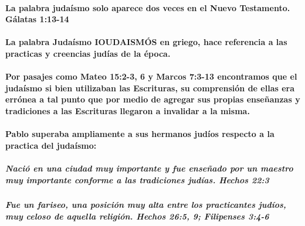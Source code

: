 \documentclass[11a pt,twoside]{article}
\let\oldparagraph\paragraph
\renewcommand{\paragraph}{\needspace{3\baselineskip}\oldparagraph}
\let\oldsubparagraph\subparagraph
\renewcommand{\subparagraph}{\needspace{2\baselineskip}\oldsubparagraph}
\begin{document}
\paragraph{La palabra judaísmo solo aparece dos veces en el Nuevo
Testamento. Gálatas
1:13-14}\label{la-palabra-judauxedsmo-solo-aparece-dos-veces-en-el-nuevo-testamento.-guxe1latas-113-14}

\paragraph{La palabra Judaísmo IOUDAISMÓS en griego, hace referencia a
las practicas y creencias judías de la
época.}\label{la-palabra-judauxedsmo-ioudaismuxf3s-en-griego-hace-referencia-a-las-practicas-y-creencias-juduxedas-de-la-uxe9poca.}

\paragraph{Por pasajes como Mateo 15:2-3, 6 y Marcos 7:3-13 encontramos
que el judaísmo si bien utilizaban las Escrituras, su comprensión de
ellas era errónea a tal punto que por medio de agregar sus propias
enseñanzas y tradiciones a las Escrituras llegaron a invalidar a la
misma.}\label{por-pasajes-como-mateo-152-3-6-y-marcos-73-13-encontramos-que-el-judauxedsmo-si-bien-utilizaban-las-escrituras-su-comprensiuxf3n-de-ellas-era-erruxf3nea-a-tal-punto-que-por-medio-de-agregar-sus-propias-enseuxf1anzas-y-tradiciones-a-las-escrituras-llegaron-a-invalidar-a-la-misma.}

\paragraph{Pablo superaba ampliamente a sus hermanos judíos respecto a
la practica del
judaísmo:}\label{pablo-superaba-ampliamente-a-sus-hermanos-juduxedos-respecto-a-la-practica-del-judauxedsmo}

\subparagraph{Nació en una ciudad muy importante y fue enseñado por un
maestro muy importante conforme a las tradiciones judías. Hechos
22:3}\label{naciuxf3-en-una-ciudad-muy-importante-y-fue-enseuxf1ado-por-un-maestro-muy-importante-conforme-a-las-tradiciones-juduxedas.-hechos-223}

\subparagraph{Fue un fariseo, una posición muy alta entre los
practicantes judíos, muy celoso de aquella religión. Hechos 26:5, 9;
Filipenses
3:4-6}\label{fue-un-fariseo-una-posiciuxf3n-muy-alta-entre-los-practicantes-juduxedos-muy-celoso-de-aquella-religiuxf3n.-hechos-265-9-filipenses-34-6}
\end{document}
